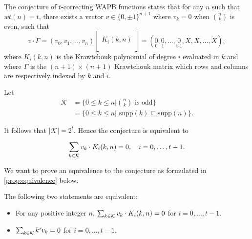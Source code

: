 The conjecture of $t$-correcting WAPB functions states that for any $n$ such that $wt(n) = t$, there exists a vector $v \in \{0, \pm 1\}^{n+1}$ where $v_k = 0$ when $\binom{n}{k}$ is even, such that
$$
v \cdot \Gamma = (v_0, v_1, \ldots, v_n)
\begin{bmatrix}
    \\
    K_i(k, n) \\
    \\
\end{bmatrix} = (\underset{\operatorname{0}}{0}, \underset{\operatorname{1}}{0}, \ldots, \underset{\operatorname{t - 1}}{0}, X, X, \ldots, X),
$$
where $K_i(k,n)$ is the Krawtchouk polynomial of degree $i$ evaluated in $k$ and where $\Gamma$ is the $(n+1) \times (n + 1)$ Krawtchouk matrix which rows and columns are respectively indexed by $k$ and $i$.

Let
\begin{equation*}
\begin{split}
    \mathcal{K} &= \{0 \leq k \leq n | \binom{n}{k} \text{ is odd}\}\\
    &=\{0 \leq k \leq n | \text{ supp}(k) \subseteq \text{supp}(n)\}.
\end{split}
\end{equation*}

It follows that $|\mathcal{K}| = 2^t$. Hence the conjecture is equivalent to

\begin{equation}\label{eq:statement}
    \sum_{k \in \mathcal{K}} v_k \cdot K_i(k, n) = 0, \quad i = 0, \ldots, t-1.
\end{equation}

We want to prove an equivalence to the conjecture as formulated in \cref{prop:equivalence} below.
\begin{proposition}\label{prop:equivalence}
    The following two statements are equivalent:
    \begin{itemize}
        \item For any positive integer $n$, $\sum_{k \in \mathcal{K}} v_k \cdot K_i(k, n) = 0$ for $i = 0, \ldots, t-1$.
        \item $\sum_{k \in \mathcal{K}} k^iv_k= 0$ for $i = 0, \ldots, t-1$.
    \end{itemize}
\end{proposition}

